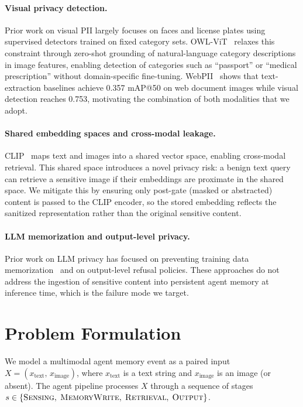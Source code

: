 \documentclass[11pt]{article}
\begin{document}
\paragraph{Visual privacy detection.}
Prior work on visual PII largely focuses on faces and license plates using supervised detectors trained on fixed category sets. OWL-ViT~\cite{owlvit} relaxes this constraint through zero-shot grounding of natural-language category descriptions in image features, enabling detection of categories such as ``passport'' or ``medical prescription'' without domain-specific fine-tuning. WebPII~\cite{webpii} shows that text-extraction baselines achieve 0.357 mAP@50 on web document images while visual detection reaches 0.753, motivating the combination of both modalities that we adopt.

\paragraph{Shared embedding spaces and cross-modal leakage.}
CLIP~\cite{clip} maps text and images into a shared vector space, enabling cross-modal retrieval. This shared space introduces a novel privacy risk: a benign text query can retrieve a sensitive image if their embeddings are proximate in the shared space. We mitigate this by ensuring only post-gate (masked or abstracted) content is passed to the CLIP encoder, so the stored embedding reflects the sanitized representation rather than the original sensitive content.

\paragraph{LLM memorization and output-level privacy.}
Prior work on LLM privacy has focused on preventing training data memorization~\cite{carlini2021} and on output-level refusal policies. These approaches do not address the ingestion of sensitive content into persistent agent memory at inference time, which is the failure mode we target.

\section{Problem Formulation}

We model a multimodal agent memory event as a paired input $X = (x_{\text{text}},\, x_{\text{image}})$, where $x_{\text{text}}$ is a text string and $x_{\text{image}}$ is an image (or absent). The agent pipeline processes $X$ through a sequence of stages $s \in \{\textsc{Sensing},\; \textsc{MemoryWrite},\; \textsc{Retrieval},\; \textsc{Output}\}$.
\end{document}
